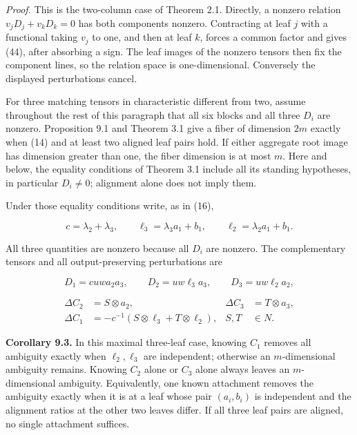 \documentclass[11pt]{article}
\begin{document}
\emph{Proof.} This is the two-column case of Theorem 2.1. Directly, a nonzero relation $v_jD_j+v_kD_k=0$ has both components nonzero. Contracting at leaf $j$ with a functional taking $v_j$ to one, and then at leaf $k$, forces a common factor and gives (44), after absorbing a sign. The leaf images of the nonzero tensors then fix the component lines, so the relation space is one-dimensional. Conversely the displayed perturbations cancel.


For three matching tensors in characteristic different from two, assume throughout the rest of this paragraph that all six blocks and all three $D_i$ are nonzero. Proposition 9.1 and Theorem 3.1 give a fiber of dimension $2m$ exactly when (14) and at least two aligned leaf pairs hold. If either aggregate root image has dimension greater than one, the fiber dimension is at most $m$. Here and below, the equality conditions of Theorem 3.1 include all its standing hypotheses, in particular $D_i\ne0$; alignment alone does not imply them.


Under those equality conditions write, as in (16),


\nopagebreak[4]

\begin{equation}
c=\lambda_2+\lambda_3,\qquad
\ell_3=\lambda_3a_1+b_1,\qquad \ell_2=\lambda_2a_1+b_1.
\tag{45}
\end{equation}

All three quantities are nonzero because all $D_i$ are nonzero. The complementary tensors and all output-preserving perturbations are


\nopagebreak[4]

\begin{equation}
D_1=cuw a_2a_3,\qquad D_2=uw\ell_3a_3,\qquad D_3=uw\ell_2a_2,
\tag{46}
\end{equation}

\begin{equation}
\begin{aligned}
\Delta C_2&=S\otimes a_2,&\Delta C_3&=T\otimes a_3,\\
\Delta C_1&=-c^{-1}(S\otimes\ell_3+T\otimes\ell_2),&S,T&\in N.
\end{aligned}
\tag{47}
\end{equation}

\textbf{Corollary 9.3.} In this maximal three-leaf case, knowing $C_1$ removes all ambiguity exactly when $\ell_2,\ell_3$ are independent; otherwise an $m$-dimensional ambiguity remains. Knowing $C_2$ alone or $C_3$ alone always leaves an $m$-dimensional ambiguity. Equivalently, one known attachment removes the ambiguity exactly when it is at a leaf whose pair $(a_i,b_i)$ is independent and the alignment ratios at the other two leaves differ. If all three leaf pairs are aligned, no single attachment suffices.
\end{document}
